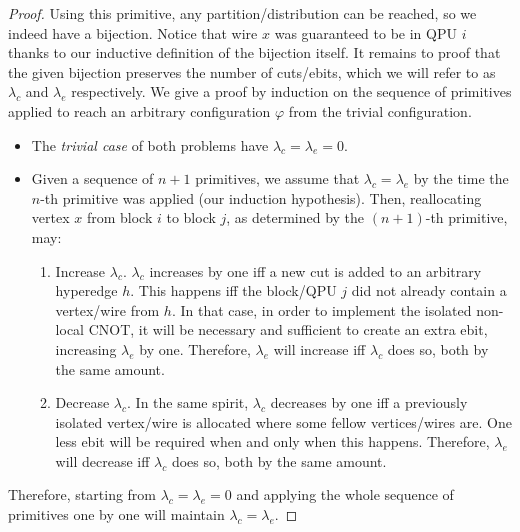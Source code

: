 \begin{proof}
Using this primitive, any partition/distribution can be reached, so we indeed have a bijection. Notice that wire \(x\) was guaranteed to be in QPU \(i\) thanks to our inductive definition of the bijection itself. It remains to proof that the given bijection preserves the number of cuts/ebits, which we will refer to as \(\lambda_c\) and \(\lambda_e\) respectively. We give a proof by induction on the sequence of primitives applied to reach an arbitrary configuration \(\varphi\) from the trivial configuration. 
\begin{itemize}
  \item The \textit{trivial case} of both problems have \(\lambda_c = \lambda_e = 0\).
  \item Given a sequence of \(n+1\) primitives, we assume that \(\lambda_c = \lambda_e\) by the time the \(n\)-th primitive was applied (our induction hypothesis). Then, reallocating vertex \(x\) from block \(i\) to block \(j\), as determined by the \((n+1)\)-th primitive, may:
    \begin{enumerate}
    \renewcommand{\theenumi}{\alph{enumi})}
      \item Increase \(\lambda_c\). \(\lambda_c\) increases by one iff a new cut is added to an arbitrary hyperedge \(h\). This happens iff the block/QPU \(j\) did not already contain a vertex/wire from \(h\). In that case, in order to implement the isolated non-local CNOT, it will be necessary and sufficient to create an extra ebit, increasing \(\lambda_e\) by one. Therefore, \(\lambda_e\) will increase iff \(\lambda_c\) does so, both by the same amount.
      \item Decrease \(\lambda_c\). In the same spirit, \(\lambda_c\) decreases by one iff a previously isolated vertex/wire is allocated where some fellow vertices/wires are. One less ebit will be required when and only when this happens. Therefore, \(\lambda_e\) will decrease iff \(\lambda_c\) does so, both by the same amount.
    \end{enumerate}
\end{itemize}

Therefore, starting from \(\lambda_c = \lambda_e = 0\) and applying the whole sequence of primitives one by one will maintain \(\lambda_c = \lambda_e\).

\end{proof}

